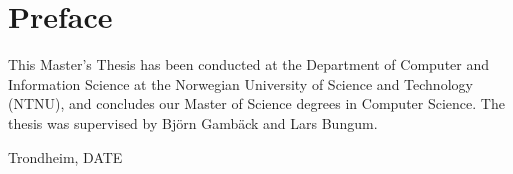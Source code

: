 \section*{Preface}

This Master's Thesis has been conducted at the Department of Computer and Information Science at the Norwegian University of Science and Technology (NTNU), and concludes our Master of Science degrees in Computer Science. The thesis was supervised by Björn Gambäck and Lars Bungum.

\vfill

\hfill \thesisAuthor

\hfill Trondheim, DATE
